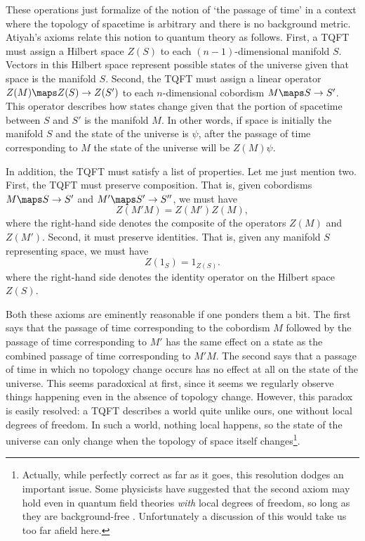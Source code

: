 These operations just formalize of the notion of `the passage of
time' in a context where the topology of spacetime is arbitrary and
there is no background metric.    Atiyah's axioms relate this notion to
quantum theory as follows.   First, a TQFT must assign a Hilbert space
$Z(S)$ to each $(n-1)$-dimensional manifold $S$.  Vectors in this
Hilbert space represent possible states of the universe given that space
is the  manifold $S$.  Second, the TQFT must assign a linear operator
$Z(M) \maps Z(S) \to Z(S')$ to each $n$-dimensional cobordism $M \maps S
\to S'$.  This operator describes how states change given that the
portion of spacetime between $S$ and $S'$ is the manifold $M$. In other
words, if space is initially the manifold $S$ and the state of  the
universe is $\psi$, after the passage of time corresponding to $M$ the
state of the universe will be $Z(M)\psi$.  

In addition, the TQFT must satisfy a list of properties.  Let me just
mention two.  First, the TQFT must preserve composition.  That is,
given cobordisms $M \maps S \to S'$ and $M' \maps S' \to S''$, we must
have 
\[                Z(M'M) = Z(M')Z(M),  \] 
where the right-hand side denotes the composite of the operators
$Z(M)$ and $Z(M')$.  Second, it must preserve identities.  That is, given
 any manifold $S$ representing space, we must have 
\[                Z(1_S) = 1_{Z(S)}  .\] 
where the right-hand side denotes the identity operator on the
Hilbert space $Z(S)$.   

Both these axioms are eminently reasonable if one ponders them a bit. 
The first says that the passage of time corresponding to the cobordism 
$M$ followed by the passage of time corresponding to $M'$ has the  same
effect on a state as the combined passage of time corresponding to
$M'M$.  The second says that a passage of time in which no topology 
change occurs has no effect at all on the state of the universe.  This
seems paradoxical at first, since it seems we regularly observe things 
happening even in the absence of topology change.   However, this
paradox is easily resolved: a TQFT describes a world quite unlike ours,
one without local degrees of freedom.  In such a world, nothing local
happens, so the state of the universe can only change when the topology
of space itself changes\footnote{Actually, while perfectly correct as
far as it goes, this resolution dodges an important issue.  Some
physicists have suggested that the second axiom may hold even in quantum
field theories {\it with} local degrees of freedom, so long as they are
background-free \cite{Barrett}. Unfortunately a discussion of this would
take us too far afield here.}.

